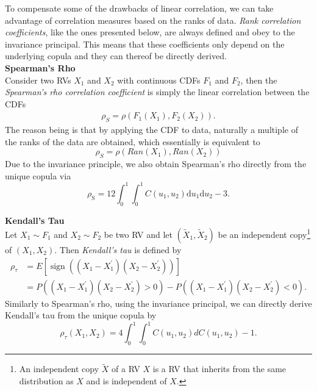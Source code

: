 
To compensate some of the drawbacks of linear correlation, we can take advantage of correlation measures based on the ranks of data. \textit{Rank correlation coefficients}, like the ones presented below, are always defined and obey to the invariance principal. This means that these coefficients only depend on the underlying copula and they can thereof be directly derived.\\

\textbf{Spearman's Rho}\\
Consider two \acp{RV} $X_1$ and $X_2$ with continuous \acp{CDF} $F_1$ and $F_2$, then the \textit{Spearman's rho correlation coefficient} is simply the linear correlation between the \acp{CDF}
\begin{align}
\rho_{S}=\rho\left(F_{1}\left(X_{1}\right), F_{2}\left(X_{2}\right)\right).
\end{align}
The reason being is that by applying the \ac{CDF} to data, naturally a multiple of the ranks of the data are obtained, which essentially is equivalent to
\begin{equation}
\rho_S = \rho ( Ran(X_1), Ran(X_2) )
\end{equation}
Due to the invariance principle, we also obtain Spearman's rho directly from the unique copula via
\begin{equation}
\rho_{\mathrm{S}}=12 \int_{0}^{1} \int_{0}^{1} C\left(u_{1}, u_{2}\right) \mathrm{d} u_{1} \mathrm{d} u_{2}-3.
\end{equation}


\textbf{Kendall's Tau}\\
Let $X_1 \sim F_1$ and $X_2 \sim F_2$ be two \ac{RV} and let $(\tilde{X}_{1}, \tilde{X}_{2})$ be an independent copy\footnote{An independent copy $\tilde{X}$ of a RV $X$ is a RV that inherits from the same distribution as $X$ and is independent of $X$.} of $({X}_{1}, {X}_{2})$. Then \textit{Kendall's tau} is defined by 
\begin{equation}
\begin{aligned}
\rho_{\tau} &={E}\left[\operatorname{sign}\left(\left(X_{1}-X_{1}^{\prime}\right)\left(X_{2}-X_{2}^{\prime}\right)\right)\right] \\
&={P}\left(\left(X_{1}-X_{1}^{\prime}\right)\left(X_{2}-X_{2}^{\prime}\right)>0\right)-{P}\left(\left(X_{1}-X_{1}^{\prime}\right)\left(X_{2}-X_{2}^{\prime}\right)<0\right).
\end{aligned}
\end{equation}
Similarly to Spearman's rho, using the invariance principal, we can directly derive Kendall's tau from the unique copula by
\begin{equation}
\rho_{\tau}\left(X_{1}, X_{2}\right)=4 \int_{0}^{1} \int_{0}^{1} C\left(u_{1}, u_{2}\right) d C\left(u_{1}, u_{2}\right)-1.
\label{eq:kendall_to_copula}
\end{equation}


